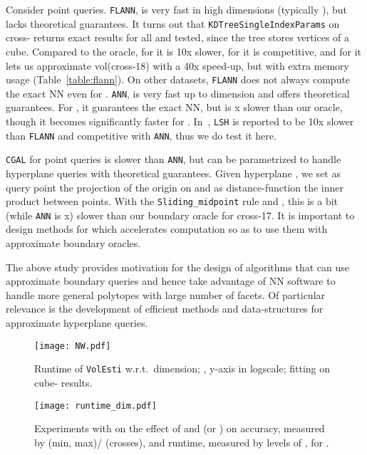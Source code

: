 \documentclass[11pt,a4paper]{article}
\begin{document}
Consider point queries.  
{\tt FLANN}, is very fast in high dimensions
(typically ), but lacks theoretical guarantees.
It turns out that {\tt KDTreeSingleIndexParams} on cross- returns
exact results for all  and  tested, since the tree stores vertices of a cube.
Compared to the  oracle, for  it is 10x slower,
for  it is competitive, and for  it lets us approximate
vol(cross-18) with a 40x speed-up, but with extra memory usage
(Table~\ref{table:flann}).   
On other datasets, {\tt FLANN} does not always compute the exact NN 
even for .
{\tt ANN}, is very fast up to dimension  and
offers theoretical guarantees. For , it guarantees the exact NN,
but is x slower than our  oracle, though it becomes
significantly faster for . In~\cite{Muja09}, {\tt LSH} is reported to be 10x slower than {\tt FLANN}
and competitive with {\tt ANN}, thus we do test it here.

{\tt CGAL} for point queries is slower than {\tt ANN}, but can be
parametrized to handle hyperplane queries with theoretical guarantees.
Given hyperplane , we set as query point the projection of the origin
on  and as distance-function the inner product between points. 
With the {\tt Sliding\_midpoint} rule and , this is a bit
(while {\tt ANN} is x) slower than our boundary oracle for cross-17.
It is important to design methods for which
 accelerates computation so as to use them with
approximate boundary oracles. 

The above study provides motivation for the design of algorithms that can use approximate boundary queries and hence take advantage of NN software to handle more general polytopes with large number of facets. 
Of particular relevance is the development of efficient methods and
data-structures for approximate hyperplane queries.



\begin{figure*}[t]
	\centering
	\texttt{[image: NW.pdf]}
	\caption{Runtime of {\tt VolEsti}
w.r.t.\ dimension; , y-axis in logscale; 
fitting on cube- results.}\label{fig:wN}
\end{figure*}

\begin{figure}[t]
	\centering
	\texttt{[image: runtime\_dim.pdf]}
	\caption{Experiments with  on the effect of  and  (or ) on
accuracy, measured by (min, max)/ (crosses), and runtime,
measured by levels of , for .}\label{fig:runtime_dim}	
\end{figure}
\end{document}
